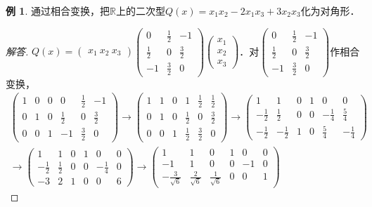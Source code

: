 \documentclass[a4paper,fontset=windows]{ctexbook}
\theoremstyle{definition}
\newtheorem{example}{例}[chapter]
\begin{document}
\begin{example}
通过相合变换，把$\mathbb{R}$上的二次型$Q(x)=x_1x_2-2x_1x_3+3x_2x_3$化为对角形．
\end{example}

\begin{proof}[解答]
$Q(x)=\begin{pmatrix}x_1~x_2~x_3\end{pmatrix}\begin{pmatrix}0&\frac{1}{2}&-1 \\ \frac{1}{2}&0&\frac{3}{2} \\ -1&\frac{3}{2}&0\end{pmatrix}\begin{pmatrix}x_1 \\ x_2 \\ x_3\end{pmatrix}$．对$\begin{pmatrix}0&\frac{1}{2}&-1 \\ \frac{1}{2}&0&\frac{3}{2} \\ -1&\frac{3}{2}&0\end{pmatrix}$作相合变换，
\begin{gather*}
\begin{pmatrix}1&0&0&0&\frac{1}{2}&-1 \\ 0&1&0&\frac{1}{2}&0&\frac{3}{2} \\ 0&0&1&-1&\frac{3}{2}&0\end{pmatrix}\to\begin{pmatrix}1&1&0&1&\frac{1}{2}&\frac{1}{2} \\ 0&1&0&\frac{1}{2}&0&\frac{3}{2} \\ 0&0&1&\frac{1}{2}&\frac{3}{2}&0\end{pmatrix}
\to\begin{pmatrix}1&1&0&1&0&0 \\ -\frac{1}{2}&\frac{1}{2}&0&0&-\frac{1}{4}&\frac{5}{4} \\ -\frac{1}{2}&-\frac{1}{2}&1&0&\frac{5}{4}&-\frac{1}{4}\end{pmatrix} \\
\to\begin{pmatrix}1&1&0&1&0&0 \\ -\frac{1}{2}&\frac{1}{2}&0&0&-\frac{1}{4}&0 \\ -3&2&1&0&0&6\end{pmatrix}
\to\begin{pmatrix}1&1&0&1&0&0 \\ -1&1&0&0&-1&0 \\ -\frac{3}{\sqrt{6}}&\frac{2}{\sqrt{6}}&\frac{1}{\sqrt{6}}&0&0&1\end{pmatrix}

\end{gather*}
\end{proof}
\end{document}
